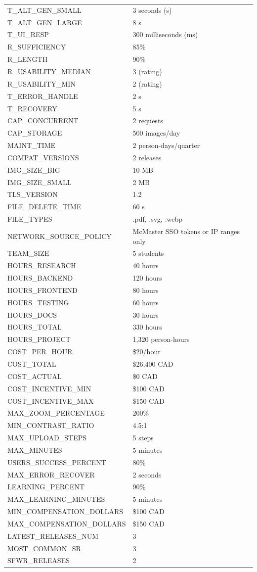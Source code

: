 \documentclass[12pt]{article}
\begin{document}
\begin{longtable}{p{}p{}}
T\_ALT\_GEN\_SMALL & 3 seconds (s) \\
T\_ALT\_GEN\_LARGE & 8 s \\
T\_UI\_RESP & 300 milliseconds (ms) \\
R\_SUFFICIENCY & 85\% \\
R\_LENGTH & 90\% \\
R\_USABILITY\_MEDIAN & 3 (rating) \\
R\_USABILITY\_MIN & 2 (rating) \\
T\_ERROR\_HANDLE & 2 s \\
T\_RECOVERY & 5 s \\
CAP\_CONCURRENT & 2 requests \\
CAP\_STORAGE & 500 images/day \\
MAINT\_TIME & 2 person-days/quarter \\
COMPAT\_VERSIONS & 2 releases \\
IMG\_SIZE\_BIG & 10 MB \\
IMG\_SIZE\_SMALL & 2 MB \\
TLS\_VERSION & 1.2 \\ 
FILE\_DELETE\_TIME & 60 s \\
FILE\_TYPES & .pdf, .svg, .webp \\
NETWORK\_SOURCE\_POLICY & McMaster SSO tokens or IP ranges only \\
TEAM\_SIZE & 5 students \\
HOURS\_RESEARCH & 40 hours \\
HOURS\_BACKEND & 120 hours \\
HOURS\_FRONTEND & 80 hours \\
HOURS\_TESTING & 60 hours \\
HOURS\_DOCS & 30 hours \\
HOURS\_TOTAL & 330 hours \\
HOURS\_PROJECT & 1,320 person-hours \\
COST\_PER\_HOUR & \$20/hour \\
COST\_TOTAL & \$26,400 CAD \\
COST\_ACTUAL & \$0 CAD \\
COST\_INCENTIVE\_MIN & \$100 CAD \\
COST\_INCENTIVE\_MAX & \$150 CAD \\
MAX\_ZOOM\_PERCENTAGE & 200\% \\
MIN\_CONTRAST\_RATIO & 4.5:1 \\
MAX\_UPLOAD\_STEPS & 5 steps \\
MAX\_MINUTES & 5 minutes \\
USERS\_SUCCESS\_PERCENT & 80\% \\
MAX\_ERROR\_RECOVER & 2 seconds \\
LEARNING\_PERCENT & 90\% \\
MAX\_LEARNING\_MINUTES & 5 minutes \\
MIN\_COMPENSATION\_DOLLARS & \$100 CAD \\ 
MAX\_COMPENSATION\_DOLLARS & \$150 CAD \\ 
LATEST\_RELEASES\_NUM & 3 \\
MOST\_COMMON\_SR & 3 \\
SFWR\_RELEASES & 2 \\


\end{longtable}
\end{document}
